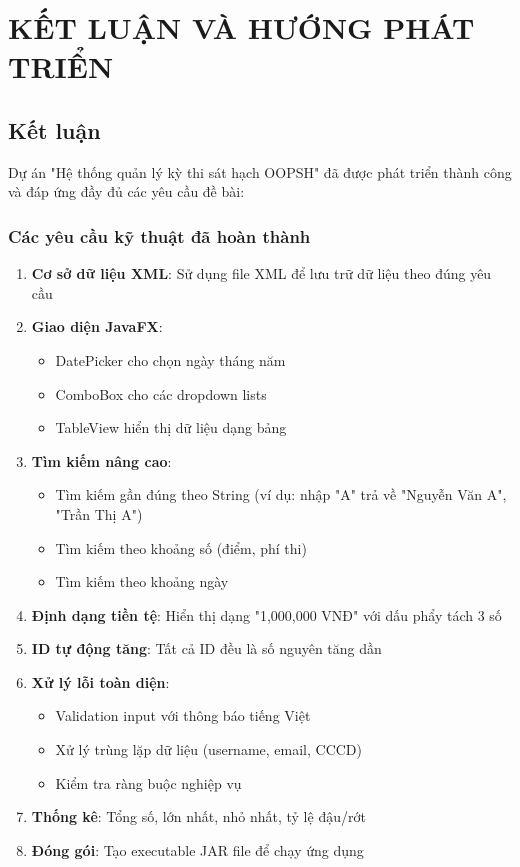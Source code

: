 \documentclass[12pt,a4paper]{article}
\begin{document}
 \section{KẾT LUẬN VÀ HƯỚNG PHÁT TRIỂN}

 \subsection{Kết luận}Dự án "Hệ thống quản lý kỳ thi sát hạch OOPSH" đã được phát triển thành công và đáp ứng đầy đủ các yêu cầu đề bài:

\subsubsection{Các yêu cầu kỹ thuật đã hoàn thành}
\begin{enumerate}
    \item \textbf{Cơ sở dữ liệu XML}: Sử dụng file XML để lưu trữ dữ liệu theo đúng yêu cầu
    \item \textbf{Giao diện JavaFX}: 
        \begin{itemize}
            \item DatePicker cho chọn ngày tháng năm
            \item ComboBox cho các dropdown lists
            \item TableView hiển thị dữ liệu dạng bảng
        \end{itemize}
    \item \textbf{Tìm kiếm nâng cao}:
        \begin{itemize}
            \item Tìm kiếm gần đúng theo String (ví dụ: nhập "A" trả về "Nguyễn Văn A", "Trần Thị A")
            \item Tìm kiếm theo khoảng số (điểm, phí thi)
            \item Tìm kiếm theo khoảng ngày
        \end{itemize}
    \item \textbf{Định dạng tiền tệ}: Hiển thị dạng "1,000,000 VNĐ" với dấu phẩy tách 3 số
    \item \textbf{ID tự động tăng}: Tất cả ID đều là số nguyên tăng dần
    \item \textbf{Xử lý lỗi toàn diện}:
        \begin{itemize}
            \item Validation input với thông báo tiếng Việt
            \item Xử lý trùng lặp dữ liệu (username, email, CCCD)
            \item Kiểm tra ràng buộc nghiệp vụ
        \end{itemize}
    \item \textbf{Thống kê}: Tổng số, lớn nhất, nhỏ nhất, tỷ lệ đậu/rớt
    \item \textbf{Đóng gói}: Tạo executable JAR file để chạy ứng dụng
\end{enumerate}
\end{document}
